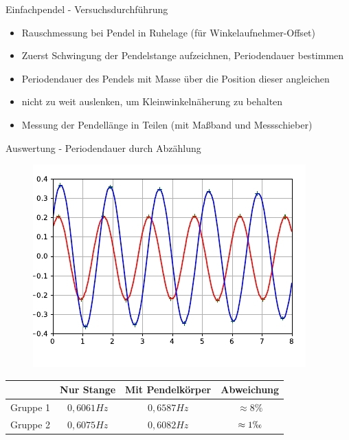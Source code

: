 \documentclass[12pt]{beamer}
\begin{document}
\begin{frame}{Einfachpendel - Versuchsdurchführung}
\begin{itemize}
\item Rauschmessung bei Pendel in Ruhelage (für Winkelaufnehmer-Offset) 
\item Zuerst Schwingung der Pendelstange aufzeichnen, Periodendauer bestimmen
\item Periodendauer des Pendels mit Masse über die Position dieser angleichen
\item nicht zu weit auslenken, um Kleinwinkelnäherung zu behalten
\item Messung der Pendellänge in Teilen (mit Maßband und Messschieber)
\end{itemize}
\end{frame}

\begin{frame}{Auswertung - Periodendauer durch Abzählung}
\vskip -0cm
\begin{figure}[t]
	\centering
	\includegraphics[scale=0.4]{Selection_075.jpg}
\end{figure}
\vskip -1cm
\begin{table}[b]
	\renewcommand{\arraystretch}{1.5}
	\centering
	\begin{tabular}{|c|c|c|c|}
		\hline 	
		& Nur Stange & Mit Pendelkörper &	Abweichung \\
		\hline	
		Gruppe 1 & $0,6061 Hz$	&	$0,6587 Hz$&$\approx 8\%$ \\
		\hline
		Gruppe 2 & $0,6075 Hz$	&	$0,6082 Hz$&$\approx 1\permil $ \\
		\hline
	\end{tabular}
\end{table}
\end{frame}
\end{document}
